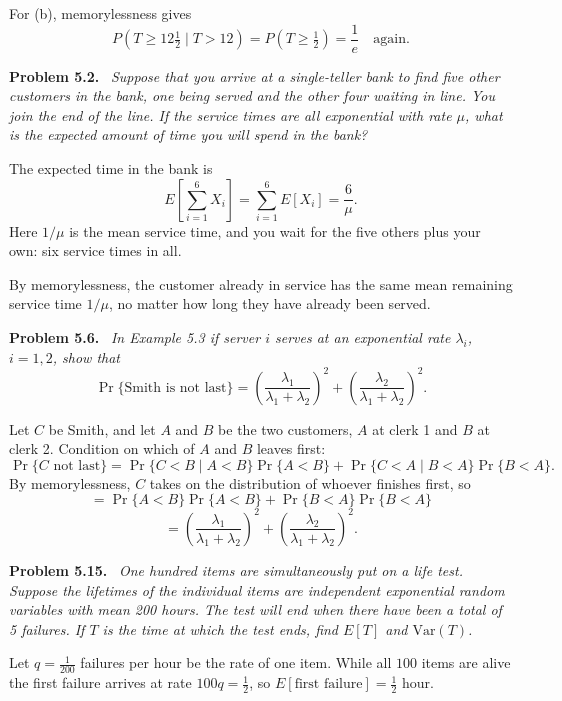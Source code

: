\documentclass[11pt]{article}
\newenvironment{problem}[1]
  {\par\medskip\noindent\textbf{Problem #1.}\ \itshape}
  {\par\medskip}
\begin{document}
For (b), memorylessness gives
$$P(T \ge 12\tfrac12 \mid T > 12) = P(T \ge \tfrac12) = \frac{1}{e} \quad \text{again}.$$

\begin{problem}{5.2}
Suppose that you arrive at a single-teller bank to find five other customers in the bank, one being served and the other four waiting in line. You join the end of the line. If the service times are all exponential with rate $\mu$, what is the expected amount of time you will spend in the bank?
\end{problem}
The expected time in the bank is
$$E\left[\sum_{i=1}^{6} X_i\right] = \sum_{i=1}^{6} E[X_i] = \frac{6}{\mu}.$$
Here $1/\mu$ is the mean service time, and you wait for the five others plus your own: six service times in all.

By memorylessness, the customer already in service has the same mean remaining service time $1/\mu$, no matter how long they have already been served.

\begin{problem}{5.6}
In Example 5.3 if server $i$ serves at an exponential rate $\lambda_i$, $i=1,2$, show that
$$\Pr\{\text{Smith is not last}\} = \left(\frac{\lambda_1}{\lambda_1+\lambda_2}\right)^{2} + \left(\frac{\lambda_2}{\lambda_1+\lambda_2}\right)^{2}.$$
\end{problem}
Let $C$ be Smith, and let $A$ and $B$ be the two customers, $A$ at clerk 1 and $B$ at clerk 2. Condition on which of $A$ and $B$ leaves first:
$$\Pr\{C\text{ not last}\} = \Pr\{C<B \mid A<B\}\Pr\{A<B\} + \Pr\{C<A \mid B<A\}\Pr\{B<A\}.$$
By memorylessness, $C$ takes on the distribution of whoever finishes first, so
$$= \Pr\{A<B\}\Pr\{A<B\} + \Pr\{B<A\}\Pr\{B<A\}$$
$$= \left(\frac{\lambda_1}{\lambda_1+\lambda_2}\right)^{2} + \left(\frac{\lambda_2}{\lambda_1+\lambda_2}\right)^{2}.$$

\begin{problem}{5.15}
One hundred items are simultaneously put on a life test. Suppose the lifetimes of the individual items are independent exponential random variables with mean 200 hours. The test will end when there have been a total of 5 failures. If $T$ is the time at which the test ends, find $E[T]$ and $\mathrm{Var}(T)$.
\end{problem}
Let $q=\tfrac{1}{200}$ failures per hour be the rate of one item. While all $100$ items are alive the first failure arrives at rate $100q=\tfrac{1}{2}$, so $E[\text{first failure}]=\tfrac{1}{2}$ hour.
\end{document}
